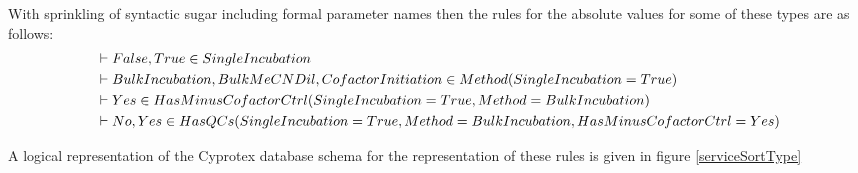 \documentclass[10pt,a4paper]{article}
\begin{document}
\noindent With sprinkling of syntactic sugar including formal parameter names then the rules for the
absolute values for some of these types are as follows: \\
\begin{align*}
& \vdash False,True \in SingleIncubation \\
& \vdash Bulk Incubation, BulkMeCNDil,Cofactor Initiation \in Method(SingleIncubation=True) \\
& \vdash Yes \in HasMinusCofactorCtrl(SingleIncubation=True,Method=Bulk Incubation) \\
& \vdash No,Yes \in HasQCs(SingleIncubation=True,Method=Bulk Incubation,HasMinusCofactorCtrl=Yes) \\
\end{align*}

\noindent
A logical representation of the Cyprotex database schema for the representation of these rules is 
given in figure \ref{serviceSortType} \\



\end{document}
